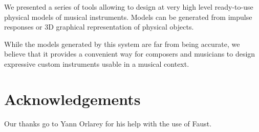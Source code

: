 \documentclass[11pt,a4paper]{article}
\begin{document}
We presented a series of tools allowing to design at very high level ready-to-use physical models of musical instruments. Models can be generated from impulse responses or 3D graphical representation of physical objects.

While the models generated by this system are far from being accurate, we believe that it provides a convenient way for composers and musicians to design expressive custom instruments usable in a musical context.  


\section{Acknowledgements}

Our thanks go to Yann Orlarey for his help with the use of Faust.



\end{document}
